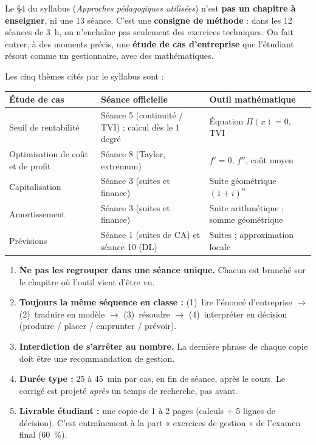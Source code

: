 \documentclass[12pt,a4paper]{article}
\begin{document}
Le \S4 du syllabus (\emph{Approches pédagogiques utilisées}) n'est \textbf{pas un chapitre à enseigner}, ni une 13 séance. C'est une \textbf{consigne de méthode} : dans les 12 séances de 3~h, on n'enchaîne pas seulement des exercices techniques. On fait entrer, à des moments précis, une \textbf{étude de cas d'entreprise} que l'étudiant résout comme un gestionnaire, avec des mathématiques.

Les cinq thèmes cités par le syllabus sont :

\begin{center}
\begin{tabular}{@{}p{}p{}p{}@{}}
\toprule
\textbf{Étude de cas} & \textbf{Séance officielle} & \textbf{Outil mathématique} \\
\midrule
Seuil de rentabilité & Séance 5 (continuité / TVI) ; calcul dès le 1\up{er} degré & Équation $\Pi(x)=0$, TVI \\
Optimisation de coût et de profit & Séance 8 (Taylor, extremum) & $f'=0$, $f''$, coût moyen \\
Capitalisation & Séance 3 (suites et finance) & Suite géométrique $(1+i)^n$ \\
Amortissement & Séance 3 (suites et finance) & Suite arithmétique ; somme géométrique \\
Prévisions & Séance 1 (suites de CA) et séance 10 (DL) & Suites ; approximation locale \\
\bottomrule
\end{tabular}
\end{center}

\begin{profbox}
\begin{enumerate}[leftmargin=1.3cm]
  \item \textbf{Ne pas les regrouper dans une séance unique.} Chacun est branché sur le chapitre où l'outil vient d'être vu.
  \item \textbf{Toujours la même séquence en classe :} (1)~lire l'énoncé d'entreprise $\to$ (2)~traduire en modèle $\to$ (3)~résoudre $\to$ (4)~interpréter en décision (produire / placer / emprunter / prévoir).
  \item \textbf{Interdiction de s'arrêter au nombre.} La dernière phrase de chaque copie doit être une recommandation de gestion.
  \item \textbf{Durée type :} 25 à 45~min par cas, en fin de séance, après le cours. Le corrigé est projeté \emph{après} un temps de recherche, pas avant.
  \item \textbf{Livrable étudiant :} une copie de 1 à 2 pages (calculs + 5 lignes de décision). C'est entraînement à la part « exercices de gestion » de l'examen final (60~\%).
\end{enumerate}
\end{profbox}
\end{document}
